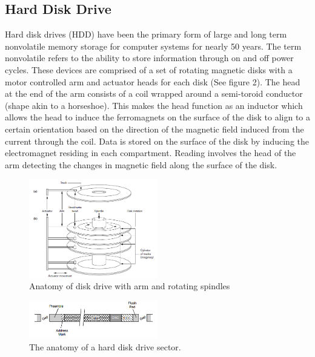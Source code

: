 \documentclass[letterpaper, 10 pt, conference]{ieeeconf}
\begin{document}
\subsection{Hard Disk Drive}
Hard disk drives (HDD) have been the primary form of large and long term nonvolatile memory storage for computer systems for nearly 50 years.  The term nonvolatile refers to the ability to store information through on and off power cycles.  These devices are comprised of a set of rotating magnetic disks with a motor controlled arm and actuator heads for each disk (See figure 2).  The head at the end of the arm consists of a coil wrapped around a semi-toroid conductor (shape akin to a horseshoe).  This makes the head function as an inductor which allows the head to induce the ferromagnets on the surface of the disk to align to a certain orientation based on the direction of the magnetic field induced from the current through the coil.  Data is stored on the surface of the disk by inducing the electromagnet residing in each compartment.  Reading involves the head of the arm detecting the changes in magnetic field along the surface of the disk. \cite{5}

\begin{figure}[H] %
	\centering
	\includegraphics [width=0.5\textwidth] {Figures/Anatomy of Disk Drive.png} 
    \caption{Anatomy of disk drive with arm and rotating spindles \cite{15}}
\end{figure}

% 
\begin{figure}[H] %
	\centering
	\includegraphics [width=0.5\textwidth] {Figures/HDD Sector.png} 
    \caption{The anatomy of a hard disk drive sector. \cite{5}}
\end{figure}
\end{document}
